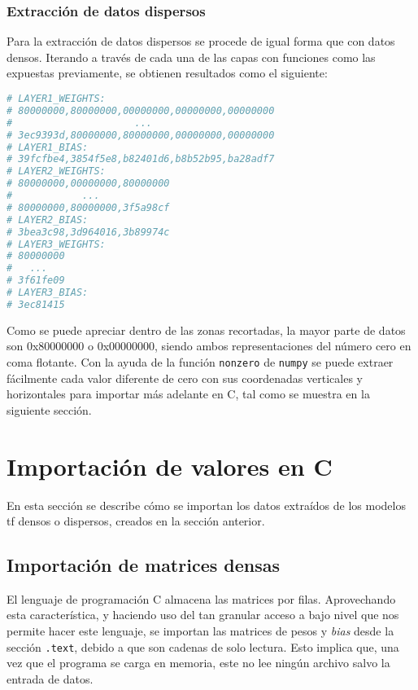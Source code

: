 \subsubsection{Extracción de datos dispersos}
\label{sssec:extraccion_datos_dispersos}
Para la extracción de datos dispersos se procede de igual forma que con datos densos. Iterando a través de cada una de las capas con funciones como las expuestas previamente, se obtienen resultados como el siguiente:\medskip
\begin{lstlisting}[language=Python]
# LAYER1_WEIGHTS:
# 80000000,80000000,00000000,00000000,00000000
#                     ...
# 3ec9393d,80000000,80000000,00000000,00000000
# LAYER1_BIAS:
# 39fcfbe4,3854f5e8,b82401d6,b8b52b95,ba28adf7
# LAYER2_WEIGHTS:
# 80000000,00000000,80000000
#            ...
# 80000000,80000000,3f5a98cf
# LAYER2_BIAS:
# 3bea3c98,3d964016,3b89974c
# LAYER3_WEIGHTS:
# 80000000
#   ...
# 3f61fe09
# LAYER3_BIAS:
# 3ec81415    
\end{lstlisting}

Como se puede apreciar dentro de las zonas recortadas, la mayor parte de datos son 0x80000000 o 0x00000000, siendo ambos representaciones del número cero en coma flotante. Con la ayuda de la función \texttt{nonzero} de \texttt{numpy} se puede extraer fácilmente cada valor diferente de cero con sus coordenadas verticales y horizontales para importar más adelante en C, tal como se muestra en la siguiente sección.

\section{Importación de valores en C}
\label{sec:importacion_valores_c}
En esta sección se describe cómo se importan los datos extraídos de los modelos \acrlong{tf} densos o dispersos, creados en la sección anterior.

\subsection{Importación de matrices densas}
\label{ssec:importacion_matrices_densas}
El lenguaje de programación C almacena las matrices por filas. Aprovechando esta característica, y haciendo uso del tan granular acceso a bajo nivel que nos permite hacer este lenguaje, se importan las matrices de pesos y \textit{bias} desde la sección \texttt{.text}, debido a que son cadenas de solo lectura. Esto implica que, una vez que el programa se carga en memoria, este no lee ningún archivo salvo la entrada de datos.

